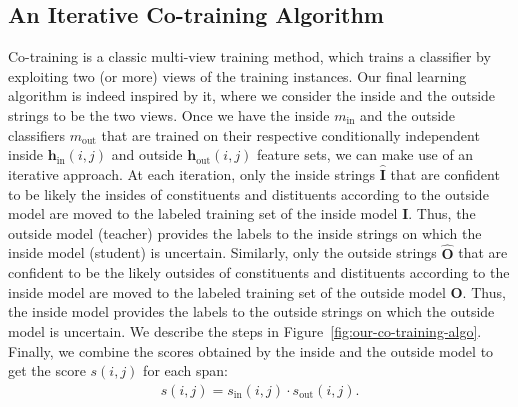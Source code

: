 \documentclass[11pt]{article}
\begin{document}
\subsection{An Iterative Co-training Algorithm}
\label{ssec:co-training-algorithm}
 Co-training \citep{10.1145/279943.279962} is a classic multi-view training method, which trains a classifier by exploiting two (or more) views of the training instances. Our final learning algorithm is indeed inspired by it, where we consider the inside and the outside strings to be the two views. Once we have the inside $m_{\text{in}}$ and the outside classifiers $m_{\text{out}}$ that are trained on their respective conditionally independent inside ${\boldsymbol{h}_{\text{in}}(i,j)}$ and outside ${\boldsymbol{h}_{\text{out}}(i,j)}$ feature sets, we can make use of an iterative approach. At each iteration, only the inside strings $\hat{\mathcal{\mathbf{I}}}$ that are confident to be likely the insides of constituents and distituents according to the outside model are moved to the labeled training set of the inside model $\mathcal{\mathbf{I}}$. Thus, the outside model (teacher) provides the labels to the inside strings on which the inside model (student) is uncertain. Similarly, only the outside strings $\hat{\mathcal{\mathbf{O}}}$ that are confident to be the likely outsides of constituents and distituents according to the inside model are moved to the labeled training set of the outside model $\mathcal{\mathbf{O}}$. Thus, the inside model provides the labels to the outside strings on which the outside model is uncertain. We describe the steps in Figure~\ref{fig:our-co-training-algo}.
Finally, we combine the scores obtained by the inside and the outside model to get the score ${s(i,j)}$ for each span:
\begin{align*}
    s(i,j) = s_{\text{in}}(i,j) \cdot s_{\text{out}}(i,j).
\end{align*}
\end{document}
